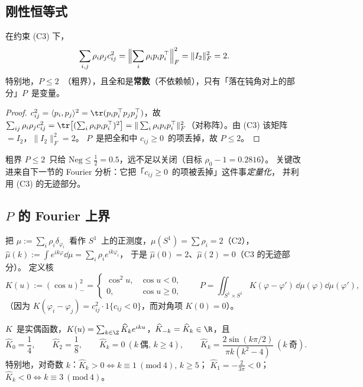 \subsection{刚性恒等式}\label{sec:r27:rigid}

\begin{lemma}[刚性恒等式]\label{lem:r27rigid}
在约束 (C3) 下，
\begin{equation}\label{eq:r27rigid}
\sum_{i,j}\rho_i\rho_jc_{ij}^2=\Bigl\|\sum_i\rho_ip_ip_i^\top\Bigr\|_F^2=\|I_2\|_F^2=2 .
\end{equation}
特别地，$P\le2$~（粗界），且全和是\textbf{常数}（不依赖帧），只有「落在钝角对上的部分」$P$~是变量。
\end{lemma}

\begin{proof}
$c_{ij}^2=\langle p_i,p_j\rangle^2=\tr(p_ip_i^\top p_jp_j^\top)$，故
$\sum_{ij}\rho_i\rho_jc_{ij}^2=\tr\bigl[(\sum_i\rho_ip_ip_i^\top)^2\bigr]
=\|\sum_i\rho_ip_ip_i^\top\|_F^2$（对称阵）。由 (C3) 该矩阵 $=I_2$，$\|I_2\|_F^2=2$。
$P$~是把全和中 $c_{ij}\ge0$~的项丢掉，故 $P\le2$。
\end{proof}

粗界 $P\le2$~只给 $\mathrm{Neg}\le\frac12=0.5$，远不足以关闭（目标 $\rho_0-1=0.2816$）。
关键改进来自下一节的 Fourier 分析：它把「$c_{ij}\ge0$~的项被丢掉」这件事\emph{定量化}，
并利用 (C3) 的无迹部分。

\subsection{$P$ 的 Fourier 上界}\label{sec:r27:fourier}

把 $\mu:=\sum_i\rho_i\delta_{\varphi_i}$~看作 $S^1$~上的正测度，$\mu(S^1)=\sum\rho_i=2$（C2），
$\widehat\mu(k):=\int e^{ik\varphi}\dd\mu=\sum_i\rho_ie^{ik\varphi_i}$，
于是 $\widehat\mu(0)=2$、$\widehat\mu(2)=0$（C3 的无迹部分）。
定义核
\begin{equation}\label{eq:r27K}
K(u):=(\cos u)_-^2=\begin{cases}\cos^2u,&\cos u<0,\\[2pt]0,&\cos u\ge0,\end{cases}
\qquad
P=\iint_{S^1\times S^1}K(\varphi-\varphi')\,\dd\mu(\varphi)\dd\mu(\varphi'),
\end{equation}
（因为 $K(\varphi_i-\varphi_j)=c_{ij}^2\cdot1\{c_{ij}<0\}$，而对角项 $K(0)=0$）。

\begin{lemma}[$K$~的 Fourier 系数]\label{lem:r27Khat}
$K$~是实偶函数，$K(u)=\sum_{k\in\Z}\widehat K_ke^{iku}$，$\widehat K_{-k}=\widehat K_k\in\R$，且
\begin{equation}\label{eq:r27Khat}
\widehat K_0=\frac14,\qquad
\widehat K_2=\frac18,\qquad
\widehat K_k=0\ (k\ \text{偶},\,k\ge4),\qquad
\widehat K_k=\frac{2\sin(k\pi/2)}{\pi k(k^2-4)}\ (k\ \text{奇}).
\end{equation}
特别地，对奇数 $k$：$\widehat K_k>0\iff k\equiv1\ (\mathrm{mod}\ 4),\,k\ge5$；
$\widehat K_1=-\frac2{3\pi}<0$；$\widehat K_k<0\iff k\equiv3\ (\mathrm{mod}\ 4)$。
\end{lemma}

